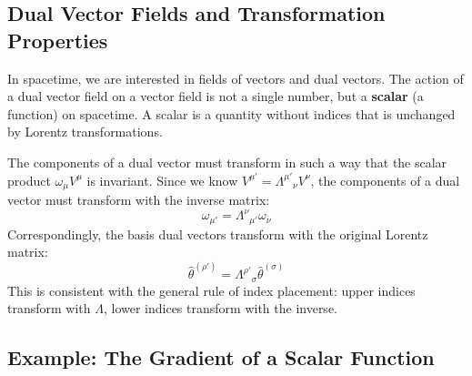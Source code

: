 \documentclass[11pt, a4paper]{report}
\begin{document}
\subsection*{Dual Vector Fields and Transformation Properties}

In spacetime, we are interested in fields of vectors and dual vectors. The action of a dual vector field on a vector field is not a single number, but a \textbf{scalar} (a function) on spacetime. A scalar is a quantity without indices that is unchanged by Lorentz transformations.

The components of a dual vector must transform in such a way that the scalar product $\omega_\mu V^\mu$ is invariant. Since we know $V^{\mu'} = {\Lambda^{\mu'}}_\nu V^\nu$, the components of a dual vector must transform with the inverse matrix:
\begin{equation}
    \omega_{\mu'} = {\Lambda^\nu}_{\mu'} \omega_\nu
\end{equation}
Correspondingly, the basis dual vectors transform with the original Lorentz matrix:
\begin{equation}
    \hat{\theta}^{(\rho')} = {\Lambda^{\rho'}}_\sigma \hat{\theta}^{(\sigma)}
\end{equation}
This is consistent with the general rule of index placement: upper indices transform with $\Lambda$, lower indices transform with the inverse.

\subsection*{Example: The Gradient of a Scalar Function}
\end{document}
